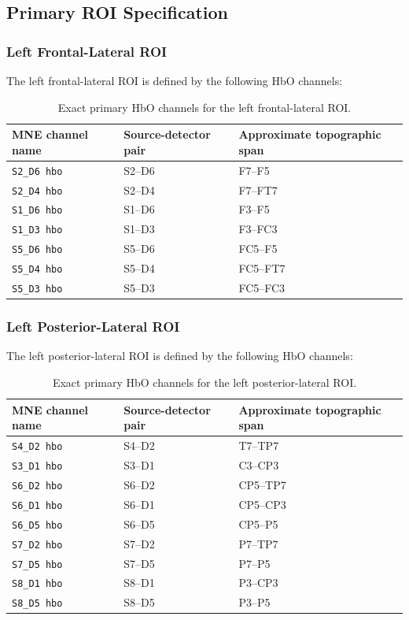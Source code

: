 \documentclass[11pt]{article}
\begin{document}
\subsection{Primary ROI Specification}

\subsubsection{Left Frontal-Lateral ROI}
The left frontal-lateral ROI is defined by the following HbO channels:

\begin{table}[ht]
\centering
\caption{Exact primary HbO channels for the left frontal-lateral ROI.}
\label{tab:front_roi_hbo}
\begin{tabular}{lll}
\hline
MNE channel name & Source-detector pair & Approximate topographic span \\
\hline
\texttt{S2\_D6 hbo} & S2--D6 & F7--F5 \\
\texttt{S2\_D4 hbo} & S2--D4 & F7--FT7 \\
\texttt{S1\_D6 hbo} & S1--D6 & F3--F5 \\
\texttt{S1\_D3 hbo} & S1--D3 & F3--FC3 \\
\texttt{S5\_D6 hbo} & S5--D6 & FC5--F5 \\
\texttt{S5\_D4 hbo} & S5--D4 & FC5--FT7 \\
\texttt{S5\_D3 hbo} & S5--D3 & FC5--FC3 \\
\hline
\end{tabular}
\end{table}

\subsubsection{Left Posterior-Lateral ROI}
The left posterior-lateral ROI is defined by the following HbO channels:

\begin{table}[ht]
\centering
\caption{Exact primary HbO channels for the left posterior-lateral ROI.}
\label{tab:back_roi_hbo}
\begin{tabular}{lll}
\hline
MNE channel name & Source-detector pair & Approximate topographic span \\
\hline
\texttt{S4\_D2 hbo} & S4--D2 & T7--TP7 \\
\texttt{S3\_D1 hbo} & S3--D1 & C3--CP3 \\
\texttt{S6\_D2 hbo} & S6--D2 & CP5--TP7 \\
\texttt{S6\_D1 hbo} & S6--D1 & CP5--CP3 \\
\texttt{S6\_D5 hbo} & S6--D5 & CP5--P5 \\
\texttt{S7\_D2 hbo} & S7--D2 & P7--TP7 \\
\texttt{S7\_D5 hbo} & S7--D5 & P7--P5 \\
\texttt{S8\_D1 hbo} & S8--D1 & P3--CP3 \\
\texttt{S8\_D5 hbo} & S8--D5 & P3--P5 \\
\hline
\end{tabular}
\end{table}
\end{document}
